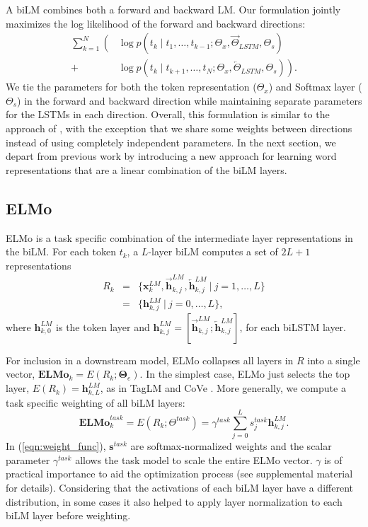 \documentclass[11pt,a4paper]{article}
\newcommand{\ELMO}{ELMo}
\begin{document}
A biLM combines both a forward and backward LM.  Our formulation jointly maximizes the log likelihood of the forward and backward directions:
\[
\begin{split}
\sum_{k=1}^N \left( \right. & \log p({t_k} \mid t_1, \ldots, t_{k-1}; \Theta_x, \overrightarrow{\Theta}_{LSTM}, \Theta_s) \\
+  & \log p({t_k} \mid t_{k+1}, \ldots, t_{N}; \Theta_x, \overleftarrow{\Theta}_{LSTM}, \Theta_s)
\left. \right).
\end{split}
\]
We tie the parameters for both the token representation ($\Theta_x$) and Softmax layer ($\Theta_s$) in the forward and backward
direction while maintaining separate parameters for the LSTMs in each direction.  Overall, this formulation is similar to the approach
of \citet{Peters2017SemisupervisedST}, with the exception that we share some weights between directions instead of using completely independent parameters. In the next section, we depart from previous work by introducing a new approach for learning word representations that are a linear combination of the biLM layers.

\subsection{\ELMO{}}
\label{sec:compute_elmo}
\ELMO{} is a task specific combination of the intermediate layer representations in the biLM.
For each token $t_k$, a $L$-layer biLM computes a set of $2L + 1$ representations
\begin{eqnarray*}
R_k & =&  \{\mathbf{x}^{LM}_{k}, \overrightarrow{\mathbf{h}}^{LM}_{k,j}, \overleftarrow{\mathbf{h}}^{LM}_{k,j} \ |\  j =1, \ldots, L \} \\
 & = & \{\mathbf{h}^{LM}_{k,j}\ | \ j=0, \ldots, L\},
\end{eqnarray*}
where $\mathbf{h}^{LM}_{k,0}$ is the token layer and $\mathbf{h}^{LM}_{k,j} = [\overrightarrow{\mathbf{h}}^{LM}_{k,j}; \overleftarrow{\mathbf{h}}^{LM}_{k,j}]$, for each biLSTM layer.

For inclusion in a downstream model, \ELMO{} collapses all layers in $R$ into a single vector, $\mathbf{ELMo}_k = E(R_k; \mathbf{\Theta}_e)$.
In the simplest case, \ELMO{} just selects the top layer, $E(R_k) = \mathbf{h}^{LM}_{k,L}$, as in TagLM \citep{Peters2017SemisupervisedST} and CoVe \citep{McCann2017LearnedIT}.
More generally, we compute a task specific weighting of all biLM layers:
\begin{equation}
\mathbf{ELMo}^{task}_k = E(R_k; \Theta^{task}) = \gamma^{task} \sum_{j=0}^L s^{task}_j \mathbf{h}^{LM}_{k,j}. \label{eqn:weight_func}
\end{equation}
In (\ref{eqn:weight_func}), $\mathbf{s}^{task}$ are softmax-normalized weights and the scalar parameter $\gamma^{task}$ allows the task model to scale the entire \ELMO{} vector.  $\gamma$ is of practical importance to aid the optimization process (see supplemental material for details).
Considering that the activations of each biLM layer have a different distribution, in some cases it also helped to apply layer normalization \citep{Ba2016LayerN} to each biLM layer before weighting.
\end{document}
